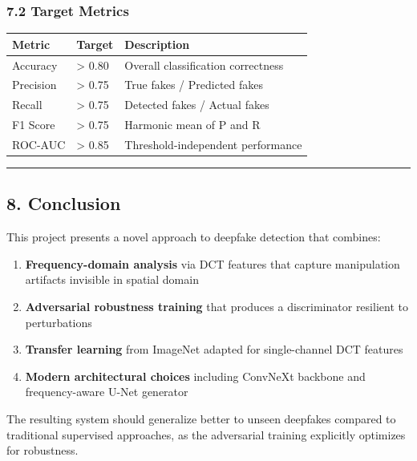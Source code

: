 \subsubsection{7.2 Target Metrics}\label{target-metrics}

\begin{longtable}[]{@{}lll@{}}
\toprule\noalign{}
Metric & Target & Description \\
\midrule\noalign{}
\endhead
\bottomrule\noalign{}
\endlastfoot
Accuracy & \textgreater{} 0.80 & Overall classification correctness \\
Precision & \textgreater{} 0.75 & True fakes / Predicted fakes \\
Recall & \textgreater{} 0.75 & Detected fakes / Actual fakes \\
F1 Score & \textgreater{} 0.75 & Harmonic mean of P and R \\
ROC-AUC & \textgreater{} 0.85 & Threshold-independent performance \\
\end{longtable}

\begin{center}\rule{0.5\linewidth}{0.5pt}\end{center}

\subsection{8. Conclusion}\label{conclusion}

This project presents a novel approach to deepfake detection that
combines:

\begin{enumerate}
\def\labelenumi{\arabic{enumi}.}
\tightlist
\item
  \textbf{Frequency-domain analysis} via DCT features that capture
  manipulation artifacts invisible in spatial domain
\item
  \textbf{Adversarial robustness training} that produces a discriminator
  resilient to perturbations
\item
  \textbf{Transfer learning} from ImageNet adapted for single-channel
  DCT features
\item
  \textbf{Modern architectural choices} including ConvNeXt backbone and
  frequency-aware U-Net generator
\end{enumerate}

The resulting system should generalize better to unseen deepfakes
compared to traditional supervised approaches, as the adversarial
training explicitly optimizes for robustness.

